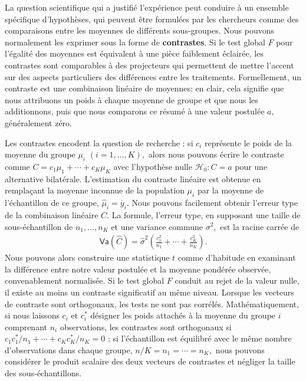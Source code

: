 \documentclass[
  11pt,
  letterpaper,
]{scrbook}
\theoremstyle{plain}
\theoremstyle{plain}
\theoremstyle{definition}
\theoremstyle{definition}
\theoremstyle{remark}
\begin{document}
La question scientifique qui a justifié l'expérience peut conduire à un
ensemble spécifique d'hypothèses, qui peuvent être formulées par les
chercheurs comme des comparaisons entre les moyennes de différents
sous-groupes. Nous pouvons normalement les exprimer sous la forme de
\textbf{contrastes}. Si le test global \(F\) pour l'égalité des moyennes
est équivalent à une pièce faiblement éclairée, les contrastes sont
comparables à des projecteurs qui permettent de mettre l'accent sur des
aspects particuliers des différences entre les traitements.
Formellement, un contraste est une combinaison linéaire de moyennes: en
clair, cela signifie que nous attribuons un poids à chaque moyenne de
groupe et que nous les additionnons, puis que nous comparons ce résumé à
une valeur postulée \(a,\) généralement zéro.

Les contrastes encodent la question de recherche : si \(c_i\) représente
le poids de la moyenne du groupe \(\mu_i\) \((i=1, \ldots, K),\) alors
nous pouvons écrire le contraste comme
\(C = c_1 \mu_1 + \cdots + c_K \mu_K\) avec l'hypothèse nulle
\(\mathscr{H}_0 : C=a\) pour une alternative bilatérale. L'estimation du
contraste linéaire est obtenue en remplaçant la moyenne inconnue de la
population \(\mu_i\) par la moyenne de l'échantillon de ce groupe,
\(\widehat{\mu}_i = \overline{y}_{i}.\) Nous pouvons facilement obtenir
l'erreur type de la combinaison linéaire \(C.\) La formule, l'erreur
type, en supposant une taille de sous-échantillon de
\(n_1, \ldots, n_K\) et une variance commune \(\sigma^2,\) est la racine
carrée de \begin{align*}
\mathsf{Va}(\widehat{C}) = \widehat{\sigma}^2\left(\frac{c_1^2}{n_1} + \cdots + \frac{c_K^2}{n_K}\right).
\end{align*} Nous pouvons alors construire une statistique \(t\) comme
d'habitude en examinant la différence entre notre valeur postulée et la
moyenne pondérée observée, convenablement normalisée. Si le test global
\(F\) conduit au rejet de la valeur nulle, il existe au moins un
contraste significatif au même niveau. Lorsque les vecteurs de contraste
sont orthogonaux, les tests ne sont pas corrélés. Mathématiquement, si
nous laissons \(c_{i}\) et \(c^{*}_{i}\) désigner les poids attachés à
la moyenne du groupe \(i\) comprenant \(n_i\) observations, les
contrastes sont orthogonaux si
\(c_{1}c^{*}_{1}/n_1 + \cdots + c_{K}c^{*}_K/n_K = 0\) ; si
l'échantillon est équilibré avec le même nombre d'observations dans
chaque groupe, \(n/K = n_1 =\cdots = n_K,\) nous pouvons considérer le
produit scalaire des deux vecteurs de contrastes et négliger la taille
des sous-échantillons.
\end{document}
